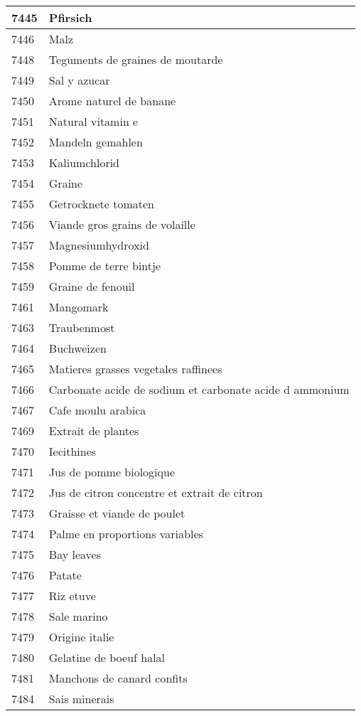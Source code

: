 \begin{longtable}{|l|l|}
7445 & Pfirsich \\ \hline 
7446 & Malz \\ \hline 
7448 & Teguments de graines de moutarde \\ \hline 
7449 & Sal y azucar \\ \hline 
7450 & Arome naturel de banane \\ \hline 
7451 & Natural vitamin e \\ \hline 
7452 & Mandeln gemahlen \\ \hline 
7453 & Kaliumchlorid \\ \hline 
7454 & Graine \\ \hline 
7455 & Getrocknete tomaten \\ \hline 
7456 & Viande gros grains de volaille \\ \hline 
7457 & Magnesiumhydroxid \\ \hline 
7458 & Pomme de terre bintje \\ \hline 
7459 & Graine de fenouil \\ \hline 
7461 & Mangomark \\ \hline 
7463 & Traubenmost \\ \hline 
7464 & Buchweizen \\ \hline 
7465 & Matieres grasses vegetales raffinees \\ \hline 
7466 & Carbonate acide de sodium et carbonate acide d ammonium \\ \hline 
7467 & Cafe moulu arabica \\ \hline 
7469 & Extrait de plantes \\ \hline 
7470 & Iecithines \\ \hline 
7471 & Jus de pomme biologique \\ \hline 
7472 & Jus de citron concentre et extrait de citron \\ \hline 
7473 & Graisse et viande de poulet \\ \hline 
7474 & Palme en proportions variables \\ \hline 
7475 & Bay leaves \\ \hline 
7476 & Patate \\ \hline 
7477 & Riz etuve \\ \hline 
7478 & Sale marino \\ \hline 
7479 & Origine italie \\ \hline 
7480 & Gelatine de boeuf halal \\ \hline 
7481 & Manchons de canard confits \\ \hline 
7484 & Sais minerais \\ \hline 

\end{longtable}
